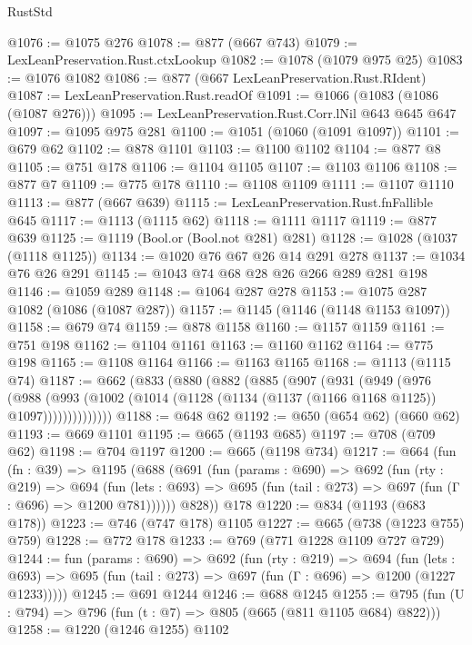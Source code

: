 \begin{lexlean}{RustStd}
\begin{coremodule}
@1076 := @1075 @276
@1078 := @877 (@667 @743)
@1079 := LexLeanPreservation.Rust.ctxLookup
@1082 := @1078 (@1079 @975 @25)
@1083 := @1076 @1082
@1086 := @877 (@667 LexLeanPreservation.Rust.RIdent)
@1087 := LexLeanPreservation.Rust.readOf
@1091 := @1066 (@1083 (@1086 (@1087 @276)))
@1095 := LexLeanPreservation.Rust.Corr.lNil @643 @645 @647
@1097 := @1095 @975 @281
@1100 := @1051 (@1060 (@1091 @1097))
@1101 := @679 @62
@1102 := @878 @1101
@1103 := @1100 @1102
@1104 := @877 @8
@1105 := @751 @178
@1106 := @1104 @1105
@1107 := @1103 @1106
@1108 := @877 @7
@1109 := @775 @178
@1110 := @1108 @1109
@1111 := @1107 @1110
@1113 := @877 (@667 @639)
@1115 := LexLeanPreservation.Rust.fnFallible @645
@1117 := @1113 (@1115 @62)
@1118 := @1111 @1117
@1119 := @877 @639
@1125 := @1119 (Bool.or (Bool.not @281) @281)
@1128 := @1028 (@1037 (@1118 @1125))
@1134 := @1020 @76 @67 @26 @14 @291 @278
@1137 := @1034 @76 @26 @291
@1145 := @1043 @74 @68 @28 @26 @266 @289 @281 @198
@1146 := @1059 @289
@1148 := @1064 @287 @278
@1153 := @1075 @287 @1082 (@1086 (@1087 @287))
@1157 := @1145 (@1146 (@1148 @1153 @1097))
@1158 := @679 @74
@1159 := @878 @1158
@1160 := @1157 @1159
@1161 := @751 @198
@1162 := @1104 @1161
@1163 := @1160 @1162
@1164 := @775 @198
@1165 := @1108 @1164
@1166 := @1163 @1165
@1168 := @1113 (@1115 @74)
@1187 := @662
    (@833
      (@880
        (@882
          (@885
            (@907
              (@931
                (@949
                  (@976
                    (@988
                      (@993
                        (@1002 (@1014 (@1128 (@1134 (@1137 (@1166 @1168 @1125)) @1097))))))))))))))
@1188 := @648 @62
@1192 := @650 (@654 @62) (@660 @62)
@1193 := @669 @1101
@1195 := @665 (@1193 @685)
@1197 := @708 (@709 @62)
@1198 := @704 @1197
@1200 := @665 (@1198 @734)
@1217 := @664
    (fun (fn : @39) =>
    @1195
      (@688
        (@691
          (fun (params : @690) =>
          @692
            (fun (rty : @219) =>
            @694
              (fun (lets : @693) =>
              @695 (fun (tail : @273) => @697 (fun (Γ : @696) => @1200 @781))))))
        @828))
    @178
@1220 := @834 (@1193 (@683 @178))
@1223 := @746 (@747 @178) @1105
@1227 := @665 (@738 (@1223 @755) @759)
@1228 := @772 @178
@1233 := @769 (@771 @1228 @1109 @727 @729)
@1244 := fun (params : @690) =>
  @692
    (fun (rty : @219) =>
    @694
      (fun (lets : @693) =>
      @695 (fun (tail : @273) => @697 (fun (Γ : @696) => @1200 (@1227 @1233)))))
@1245 := @691 @1244
@1246 := @688 @1245
@1255 := @795 (fun (U : @794) => @796 (fun (t : @7) => @805 (@665 (@811 @1105 @684) @822)))
@1258 := @1220 (@1246 @1255) @1102

\end{coremodule}
\end{lexlean}
